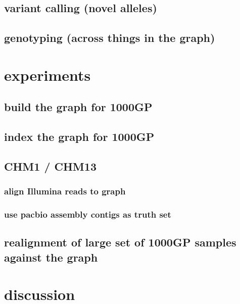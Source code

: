 \documentclass{article}
\begin{document}
\subsection{variant calling (novel alleles)}

\subsection{genotyping (across things in the graph)}


\section{experiments}

\subsection{build the graph for 1000GP}

\subsection{index the graph for 1000GP}

\subsection{CHM1 / CHM13}
\subsubsection{align Illumina reads to graph}
\subsubsection{use pacbio assembly contigs as truth set}

\subsection{realignment of large set of 1000GP samples against the graph}


\section{discussion}

{}


\end{document}
